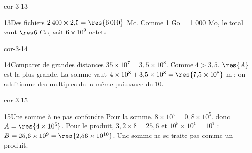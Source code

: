 \begin{blocLivre}{cor-3-13}\begin{corrige}{13}{Des fichiers}
$2\,400\times2{,}5=\res{6\,000}$ Mo. Comme 1 Go = 1 000 Mo, le total vaut $\res6$ Go, soit $6\times10^9$ octets.
\end{corrige}\end{blocLivre}
\begin{blocLivre}{cor-3-14}\begin{corrige}{14}{Comparer de grandes distances}
$35\times10^7=3{,}5\times10^8$. Comme $4>3{,}5$, $\res{A}$ est la plus grande. La somme vaut $4\times10^8+3{,}5\times10^8=\res{7{,}5\times10^8}$ m : on additionne des multiples de la même puissance de 10.
\end{corrige}\end{blocLivre}
\begin{blocLivre}{cor-3-15}\begin{corrige}{15}{Une somme à ne pas confondre}
Pour la somme, $8\times10^4=0{,}8\times10^5$, donc $A=\res{4\times10^5}$. Pour le produit, $3{,}2\times8=25{,}6$ et $10^5\times10^4=10^9$ : $B=25{,}6\times10^9=\res{2{,}56\times10^{10}}$. Une somme ne se traite pas comme un produit.
\end{corrige}\end{blocLivre}

